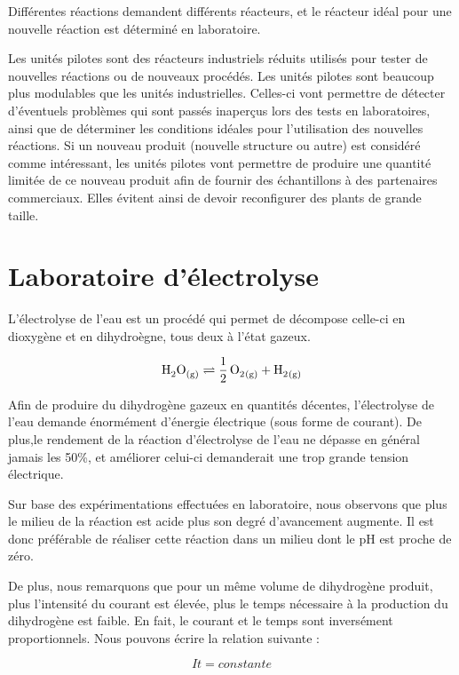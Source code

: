 \documentclass[a4paper, oneside, 12pt]{article}
\begin{document}
Différentes réactions demandent différents réacteurs, et le réacteur idéal pour une nouvelle réaction est déterminé en laboratoire.
 
Les unités pilotes sont des réacteurs industriels réduits utilisés pour tester de nouvelles réactions ou de nouveaux procédés. Les unités pilotes sont beaucoup plus modulables que les unités industrielles. Celles-ci vont permettre de détecter d'éventuels problèmes qui sont passés inaperçus lors des tests en laboratoires, ainsi que de déterminer les conditions idéales pour l'utilisation des nouvelles réactions. Si un nouveau produit (nouvelle structure ou autre) est considéré comme intéressant, les unités pilotes vont permettre de produire une quantité limitée de ce nouveau produit afin de fournir des échantillons à des partenaires commerciaux. Elles évitent ainsi de devoir reconfigurer des plants de grande taille.

\section{Laboratoire d’électrolyse}

L'électrolyse de l'eau est un procédé qui permet de décompose celle-ci en dioxygène et en dihydroègne, tous deux à l'état gazeux.

\begin{equation*}
	\ce{H2O_{(g)} \rightleftharpoons  \frac{1}{2} \, O2_{(g)} + H2_{(g)}} 
\end{equation*}

Afin de produire du dihydrogène gazeux en quantités décentes, l'électrolyse de l'eau demande énormément d'énergie électrique (sous forme de courant). De plus,le rendement de la réaction d'électrolyse de l'eau ne dépasse en général jamais les 50\%, et améliorer celui-ci demanderait une trop grande tension électrique.

Sur base des expérimentations effectuées en laboratoire, nous observons que plus le milieu de la réaction est acide plus son degré d'avancement augmente. Il est donc préférable de réaliser cette réaction dans un milieu dont le pH est proche de zéro.

De plus, nous remarquons que pour un même volume de dihydrogène produit, plus l'intensité du courant est élevée, plus le temps nécessaire à la production du dihydrogène est faible. En fait, le courant et le temps sont inversément proportionnels. Nous pouvons écrire la relation suivante : 

\begin{equation*}
	It = constante
\end{equation*}
\end{document}
